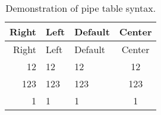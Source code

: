 \documentclass[
]{article}
\begin{document}
\begin{longtable}[]{@{}|r|l|l|c|@{}}
\caption{Demonstration of pipe table syntax.}\tabularnewline
\toprule()
Right & Left & Default & Center \\
\midrule()
\endfirsthead
\toprule()
Right & Left & Default & Center \\
\midrule()
\endhead
12 & 12 & 12 & 12 \\

\midrule
123 & 123 & 123 & 123 \\

\midrule
1 & 1 & 1 & 1 \\
\bottomrule()
\end{longtable}
\end{document}
